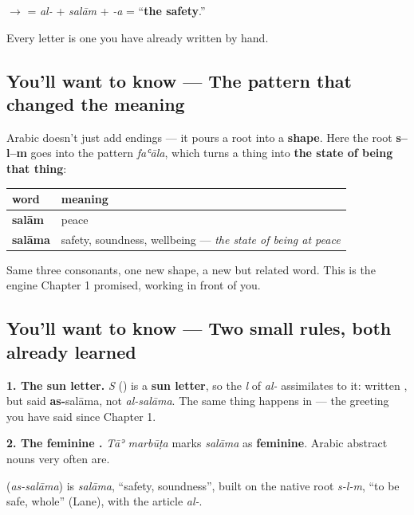 $\to$ \textbf{} = \emph{al-} + \emph{salām} + \emph{-a} = \textquotedblleft{}\textbf{the safety}.\textquotedblright{}

Every letter is one you have already written by hand.

\subsection*{You'll want to know — The pattern that changed the meaning}
Arabic doesn't just add endings — it pours a root into a \textbf{shape}. Here the root \textbf{s–l–m} goes into the pattern \emph{faʿāla}, which turns a thing into \textbf{the state of being that thing}:

\noindent
\begin{tabularx}{\linewidth}{@{}>{\raggedright\arraybackslash}X>{\raggedright\arraybackslash}X@{}}
\toprule
\textbf{word} & \textbf{meaning} \\
\midrule
\textbf{salām} & peace \\
\textbf{salāma} & safety, soundness, wellbeing — \emph{the state of being at peace} \\
\bottomrule
\end{tabularx}

Same three consonants, one new shape, a new but related word. This is the engine Chapter 1 promised, working in front of you.

\subsection*{You'll want to know — Two small rules, both already learned}
\textbf{1. The sun letter.} \emph{S} (\textbf{}) is a \textbf{sun letter}, so the \emph{l} of \emph{al-} assimilates to it: written \textbf{}, but said \textbf{as-}salāma, not \emph{al-salāma}. The same thing happens in \textbf{}  — the greeting you have said since Chapter 1.

\textbf{2. The feminine .} \emph{Tāʾ marbūṭa} marks \emph{salāma} as \textbf{feminine}. Arabic abstract nouns very often are.

\begin{cousinweb}
\textbf{} (\emph{as-salāma}) is \emph{salāma}, \textquotedblleft{}safety, soundness\textquotedblright{}, built on the native root \emph{s-l-m}, \textquotedblleft{}to be safe, whole\textquotedblright{} (Lane), with the article \emph{al-}.
\end{cousinweb}

